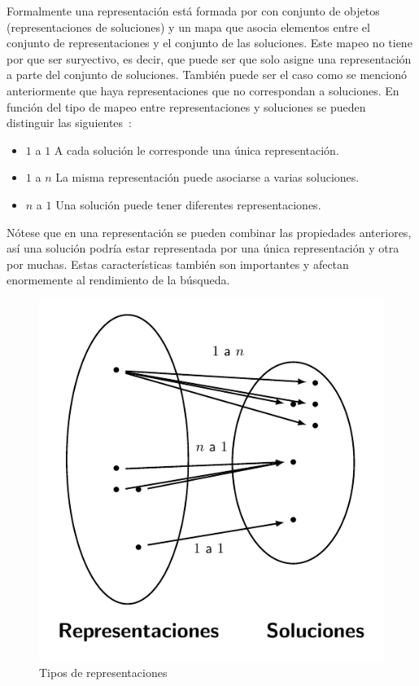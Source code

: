 Formalmente una representación está formada por con conjunto de objetos (representaciones de soluciones) y un mapa que asocia elementos entre el conjunto de representaciones
y el conjunto de las soluciones. 
%
Este mapeo no tiene por que ser suryectivo, es decir, que puede ser que solo asigne una representación a parte del conjunto de soluciones. 
%
También puede ser el caso como se mencionó anteriormente que haya representaciones que no correspondan a soluciones. 
%
En función del tipo de mapeo entre representaciones y soluciones se pueden distinguir las siguientes~\cite{Cheng1996}:
\begin{itemize}
    \item $1$ a $1$ A cada solución le corresponde una única representación.
    \item $1$ a $n$ La misma representación puede asociarse a varias soluciones.
    \item $n$ a $1$ Una solución puede tener diferentes representaciones.
\end{itemize}

Nótese que en una representación se pueden combinar las propiedades anteriores, así una solución podría estar representada por una única representación
y otra por muchas.
%
Estas características también son importantes y afectan enormemente al rendimiento de la búsqueda.

\begin{figure}[H]
    \centering
    \includegraphics[scale=1]{Imagenes/representacion.pdf}
    \caption{Tipos de representaciones}
\end{figure}

